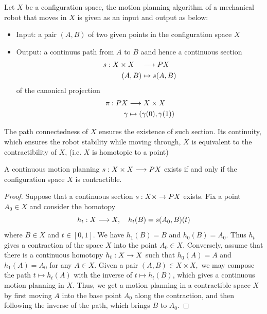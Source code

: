 \begin{defn}
    Let $X$ be a configuration space, the motion planning algorithm of a mechanical robot that moves in $X$ is given as an input and output as below:
    \begin{itemize}
        \item Input: a pair $(A,B)$ of two given points in the configuration space $X$
        \item Output: a continuus path from $A$ to $B$ aand hence a continuous section
              \begin{align*}
                  s: X \times X \quad & \longrightarrow PX        \\
                  (A,B)               & \mapsto s(A,B)
              \end{align*}
              of the canonical projection
              \begin{align*}
                  \pi: PX & \longrightarrow X \times X               \\
                  \gamma  & \mapsto (\gamma(0),\gamma(1))
              \end{align*}
    \end{itemize}
\end{defn}

\begin{rem}
    The path connectedness of $X$ ensures the existence of such section. Its continuity, which ensures the robot stability while moving through, $X$  is equivalent to the contractibility of $X$, (i.e. $X$ is homotopic to a
    point)
\end{rem}

\begin{thm}\cite{farber2003topological}\label{farber:thm:1}
    A continuous motion planning $s: X \times X \longrightarrow PX$ exists if and only if the configuration space $X$ is contractible.
\end{thm}

\begin{proof}
    Suppose that a continuous section $s: X \times \rightarrow PX$ exists. Fix a point $A_0 \in X$ and consider the homotopy \[ h_t : X \longrightarrow X, \quad h_t(B) = s(A_0, B)(t) \] where $B \in X$ and $t \in [0,1]$. We have $h_1(B) = B$ and $h_0(B) = A_0$. Thus $h_t$ gives a contraction of the space $X$ into the point $A_0 \in X$. Conversely, assume that there is a continuous homotopy $h_t: X \rightarrow X$ such that $h_0(A) = A$ and $h_1(A) = A_0$ for any $A \in X$. Given a pair $(A,B) \in X \times X,$ we may compose the path $t \mapsto h_t(A)$ with the inverse of $t \mapsto h_t(B)$, which gives a continuous motion planning in $X$. Thus, we get a motion planning in a contractible space $X$ by first moving $A$ into the base point $A_0$ along the contraction, and then following the inverse of the path, which brings $B$ to $A_0$.
\end{proof}

